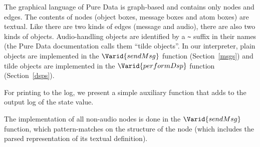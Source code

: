 The graphical language of Pure Data is graph-based and contains only nodes and
edges. The contents of nodes (object boxes, message boxes and atom boxes) are
textual. Like there are two kinds of edges (message and audio), there are also
two kinds of objects. Audio-handling objects are identified by a \texttt{\textasciitilde{}}
suffix in their names (the Pure Data documentation calls them ``tilde
objects''. In our interpreter, plain objects are implemented in the
\ensuremath{\Varid{sendMsg}} function (Section~\ref{msgs}) and tilde objects are
implemented in the \ensuremath{\Varid{performDsp}} function (Section~\ref{dsps}).

For printing to the log, we present a simple auxiliary function that adds to
the output log of the state value.

\resethooks

The implementation of all non-audio nodes is done in the \ensuremath{\Varid{sendMsg}}
function, which pattern-matches on the structure of the node (which includes
the parsed representation of its textual definition). 

\resethooks

